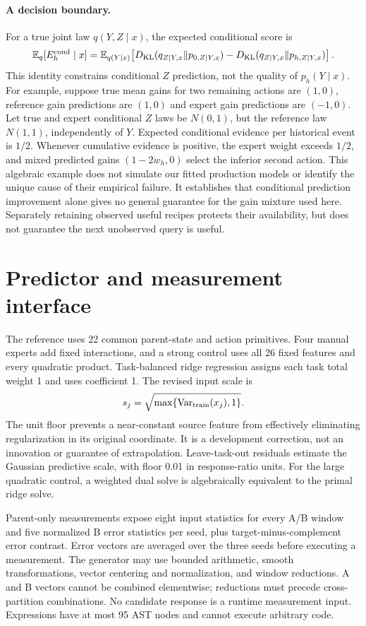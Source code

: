 \documentclass[10pt]{article}
\begin{document}
\paragraph{A decision boundary.}
For a true joint law $q(Y,Z\mid x)$, the expected conditional score is
\[
 \mathbb E_q[E_h^{\rm cond}\mid x]
 =\mathbb E_{q(Y\mid x)}\!\left[
 D_{\rm KL}(q_{Z\mid Y,x}\Vert p_{0,Z\mid Y,x})
 -D_{\rm KL}(q_{Z\mid Y,x}\Vert p_{h,Z\mid Y,x})\right].
\]
This identity constrains conditional $Z$ prediction, not the quality of $p_h(Y\mid x)$.
For example, suppose true mean gains for two remaining actions are $(1,0)$, reference gain predictions are $(1,0)$ and expert gain predictions are $(-1,0)$.
Let true and expert conditional $Z$ laws be $N(0,1)$, but the reference law $N(1,1)$, independently of $Y$.
Expected conditional evidence per historical event is $1/2$.
Whenever cumulative evidence is positive, the expert weight exceeds $1/2$, and mixed predicted gains $(1-2w_h,0)$ select the inferior second action.
This algebraic example does not simulate our fitted production models or identify the unique cause of their empirical failure.
It establishes that conditional prediction improvement alone gives no general guarantee for the gain mixture used here.
Separately retaining observed useful recipes protects their availability, but does not guarantee the next unobserved query is useful.

\section{Predictor and measurement interface}
The reference uses 22 common parent-state and action primitives.
Four manual experts add fixed interactions, and a strong control uses all 26 fixed features and every quadratic product.
Task-balanced ridge regression assigns each task total weight 1 and uses coefficient 1.
The revised input scale is
\[
 s_j=\sqrt{\max\{\operatorname{Var}_{\rm train}(x_j),1\}}.
\]
The unit floor prevents a near-constant source feature from effectively eliminating regularization in its original coordinate.
It is a development correction, not an innovation or guarantee of extrapolation.
Leave-task-out residuals estimate the Gaussian predictive scale, with floor 0.01 in response-ratio units.
For the large quadratic control, a weighted dual solve is algebraically equivalent to the primal ridge solve.

Parent-only measurements expose eight input statistics for every A/B window and five normalized B error statistics per seed, plus target-minus-complement error contrast.
Error vectors are averaged over the three seeds before executing a measurement.
The generator may use bounded arithmetic, smooth transformations, vector centering and normalization, and window reductions.
A and B vectors cannot be combined elementwise; reductions must precede cross-partition combinations.
No candidate response is a runtime measurement input.
Expressions have at most 95 AST nodes and cannot execute arbitrary code.
\end{document}
